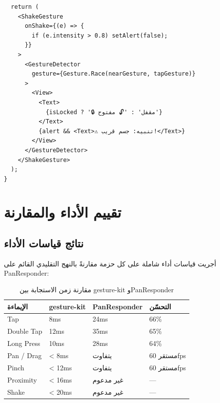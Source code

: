 \begin{Arabic}
\begin{english}
\begin{verbatim}
  return (
    <ShakeGesture
      onShake={(e) => {
        if (e.intensity > 0.8) setAlert(false);
      }}
    >
      <GestureDetector
        gesture={Gesture.Race(nearGesture, tapGesture)}
      >
        <View>
          <Text>
            {isLocked ? '🔒 مقفل' : '🔓 مفتوح'}
          </Text>
          {alert && <Text>⚠️ تنبيه: جسم قريب!</Text>}
        </View>
      </GestureDetector>
    </ShakeGesture>
  );
}
\end{verbatim}
\end{english}

\section{تقييم الأداء والمقارنة}

\subsection{نتائج قياسات الأداء}

أجريت قياسات أداء شاملة على كل حزمة مقارنةً بالنهج التقليدي القائم على \textenglish{PanResponder}:

\begin{table}[htbp]
\centering
\caption{مقارنة زمن الاستجابة بين \textenglish{gesture-kit} و\textenglish{PanResponder}}
\label{tab:perf-compare}
\begin{tabularx}{\textwidth}{XXXX}
\toprule
\textbf{الإيماءة} & \textbf{\textenglish{gesture-kit}} & \textbf{\textenglish{PanResponder}} & \textbf{التحسّن} \\
\midrule
\textenglish{Tap} & 8ms & 24ms & 66\% \\
\rowcolor{gray!10}
\textenglish{Double Tap} & 12ms & 35ms & 65\% \\
\textenglish{Long Press} & 10ms & 28ms & 64\% \\
\rowcolor{gray!10}
\textenglish{Pan / Drag} & < 8ms & يتفاوت & مستقر 60fps \\
\textenglish{Pinch} & < 12ms & يتفاوت & مستقر 60fps \\
\rowcolor{gray!10}
\textenglish{Proximity} & < 16ms & غير مدعوم & --- \\
\textenglish{Shake} & < 20ms & غير مدعوم & --- \\
\bottomrule
\end{tabularx}
\end{table}


\end{Arabic}
